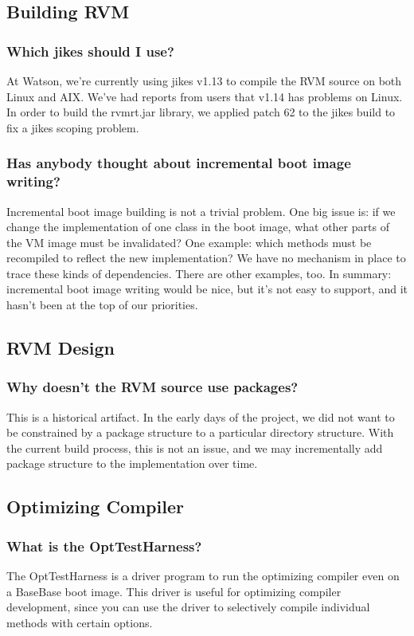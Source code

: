 \subsection{Building RVM}

\subsubsection{Which jikes should I use?}
At Watson, we're currently using jikes v1.13 to compile the RVM source on
both Linux and AIX.  We've had reports from users that v1.14 has problems
on Linux.  In order to build the rvmrt.jar library, we applied patch 62 to
the jikes build to fix a jikes scoping problem.


\subsubsection{Has anybody thought about incremental boot image writing?}

Incremental boot image building is not a trivial problem.  One big
issue is: if we change the implementation of one class in the boot image,
what other parts of the VM image must be invalidated?  One example: which
methods must be recompiled to reflect the new implementation?  We have no
mechanism in place to trace these kinds of dependencies.  There are other
examples, too.  In summary: incremental boot image writing would be nice,
but it's not easy to support, and it hasn't been at the top of our
priorities.

\subsection{RVM Design}

\subsubsection{Why doesn't the RVM source use packages?}

This is a historical artifact.  In the early days of the project, we did
not want to be constrained by a package structure to a particular
directory structure.  With the current build process, this is not an
issue, and we may incrementally add package structure to the
implementation over time.

\subsection{Optimizing Compiler}

\subsubsection{What is the OptTestHarness?}

The OptTestHarness is a driver program to run the optimizing compiler even
on a BaseBase boot image.  This driver is useful for optimizing compiler
development, since you can use the driver to selectively compile
individual methods with certain options.
